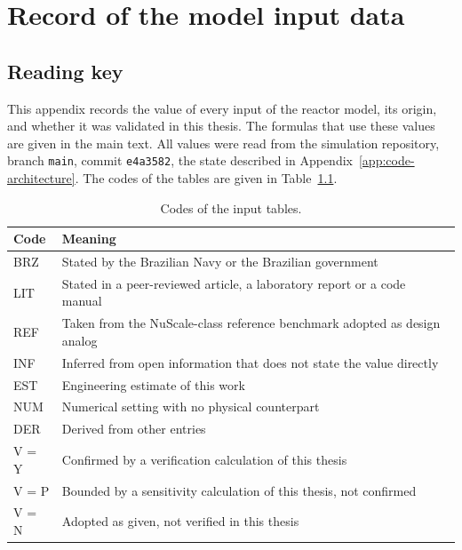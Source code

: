 
\chapter{Record of the model input data}
\label{app:model-inputs}
\label{app:labgene-data}

\section{Reading key}
\label{app:inputs-purpose}

This appendix records the value of every input of the reactor model,
its origin, and whether it was validated in this thesis. The formulas
that use these values are given in the main text. All values were read
from the simulation repository, branch \texttt{main}, commit
\texttt{e4a3582}, the state described in
Appendix~\ref{app:code-architecture}. The codes of the tables are given
in Table~\ref{tab:in-key}.

\begin{table}[htbp]
  \centering
  \small
  \caption{Codes of the input tables.}
  \label{tab:in-key}
  \begin{tabularx}{\textwidth}{@{}l>{\raggedright\arraybackslash}X@{}}
    \toprule
    Code & Meaning \\
    \midrule
    BRZ & Stated by the Brazilian Navy or the Brazilian government \\
    LIT & Stated in a peer-reviewed article, a laboratory report or a code manual \\
    REF & Taken from the NuScale-class reference benchmark adopted as design analog \\
    INF & Inferred from open information that does not state the value directly \\
    EST & Engineering estimate of this work \\
    NUM & Numerical setting with no physical counterpart \\
    DER & Derived from other entries \\
    \midrule
    V = Y & Confirmed by a verification calculation of this thesis \\
    V = P & Bounded by a sensitivity calculation of this thesis, not confirmed \\
    V = N & Adopted as given, not verified in this thesis \\
    \bottomrule
  \end{tabularx}
\end{table}

